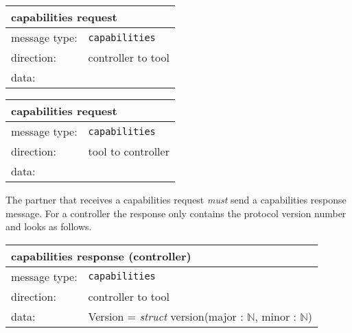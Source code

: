 \documentclass{article}
\newcommand{\msg}[1]{\texttt{#1}}
\begin{document}
   \begin{table}[H]
    \begin{center}
     \begin{tabular}{|ll|}
      \hline
       \multicolumn{2}{|l|}{\textbf{capabilities request}} \\
      \hline
       message type:    & \msg{capabilities} \\
      \hline
       direction:       & controller to tool \\
      \hline
       data:            & \\
      \hline
     \end{tabular}
     \begin{tabular}{|ll|}
      \hline
       \multicolumn{2}{|l|}{\textbf{capabilities request}} \\
      \hline
       message type:    & \msg{capabilities} \\
      \hline
       direction:       & tool to controller \\
      \hline
       data:            & \\
      \hline
     \end{tabular}
     \vspace{-0.5cm}
    \end{center}
   \end{table}

   \noindent The partner that receives a capabilities request \emph{must} send
   a capabilities response message. For a controller the response only contains
   the protocol version number and looks as follows.

   \begin{table}[H]
    \begin{center}
     \begin{tabular}{|ll|}
      \hline
       \multicolumn{2}{|l|}{\textbf{capabilities response (controller)}} \\
      \hline
       message type:   & \msg{capabilities} \\
      \hline
       direction:      & controller to tool \\
      \hline
       data:           & Version = \textit{struct} version(major : $\mathbb{N}$, minor : $\mathbb{N}$) \\
      \hline
     \end{tabular}
    \end{center}
    \vspace{-0.5cm}
   \end{table}
\end{document}
